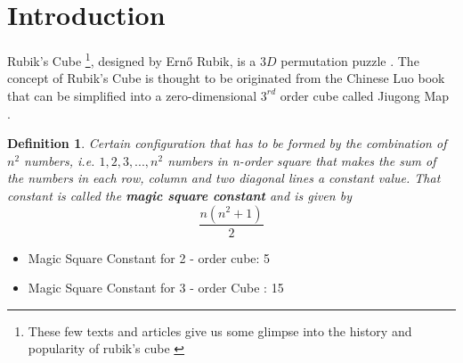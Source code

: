 \documentclass[12pt,a4paper]{article}
\theoremstyle{custom}
\newtheorem*{definition}{Definition}
\newcommand{\Ttwo}{2$\times$2$\times$2-}
\newcommand{\Tthree}{3$\times$3$\times$3-}
\begin{document}
\thispagestyle{empty}
\thispagestyle{empty}\tableofcontents\thispagestyle{empty}\thispagestyle{empty}
\clearpage
\newpage

\thispagestyle{empty}
\begin{abstract}
   The \Tthree cube is the subject of numerous works and is examined several times as a group \cite{JC,TD,DDJT,DJ,RMG,TR}. Not only that, 
The \textit{God's Number} (the maximum required number of rotations of the optimal solution path) is the subject of many works and has often been calculated and improved by new algorithms \cite{Godgrol,salkinder2021n,RMG,Hu,TR,doi:10.1137/120867366,MMFAA}. 
The calculation of the \textit{God's Number} of the \Tthree cube is much more demanding and therefore also more interesting than that of the \Ttwo cube. The motivation of this work is to apply the knowledge of the \Tthree cube in \Ttwo cube. In contrast to the \Tthree cube, the \Ttwo cube has fewer pieces and no edge cubies - this makes the smaller cube less complex. However, the \Ttwo cube can be rotated due to the lack of center cubies, which means that the top side can be changed at will. In this work, the knowledge of the group of the \Tthree cube is adapted and thus the \Ttwo cube is represented using group theory to gain knowledge about the cube which includes calculating the number of possible cube configurations and creating a concept for finding the optimal solution path. 
\end{abstract}
\clearpage



\newpage
{}
\pagestyle{plain}

\section{Introduction}
Rubik's Cube \footnote{These few texts and articles give us some glimpse into the history and popularity of rubik's cube \cite{pekonen2021cubed, demaine2011algorithms,2018ChJME..31...77Z,bandelow1982inside,Hofstader,singmaster1980notes} }, designed by Ern\H{o} Rubik, is a $3D$ permutation puzzle \cite{wong2010group}. The concept of Rubik's Cube is thought to be originated from the Chinese Luo book that can be simplified into a zero-dimensional $3^{rd}$ order cube called Jiugong Map \cite{2018ChJME..31...77Z}.

\begin{definition} Certain configuration that has to be formed by the combination of $n^2$ numbers, i.e. {$1,2,3,..., n^2$} numbers in n-order square that makes the sum of the numbers in each row, column and two diagonal lines a constant value. That constant is called the \textbf{magic square constant} \cite{zen} and is given by $$\boxed{\frac{n(n^2+1)}{2}}$$
\end{definition}
\begin{itemize}
    \item Magic Square Constant for 2 - order cube: 5
    \item Magic Square Constant for 3 - order Cube : 15
\end{itemize}
\end{document}
